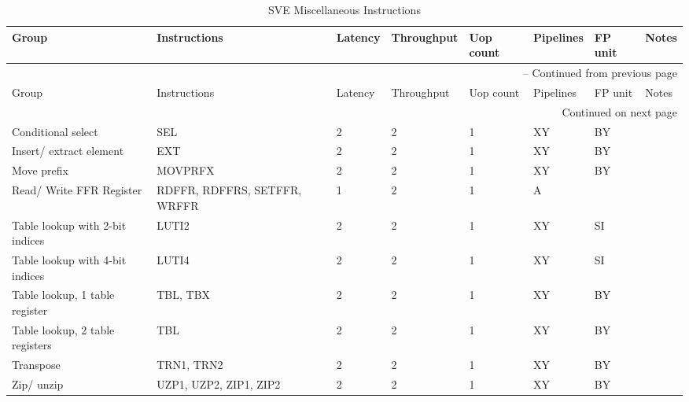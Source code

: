 \newpage
\begin{longtable}{|p{1in}|p{1in}|l|l|l|p{1in}|l|p{1in}|}
\caption{SVE Miscellaneous Instructions} \\
\hline
Group & Instructions & Latency & Throughput & Uop count & Pipelines & FP unit & Notes\\
\hline
\endfirsthead
\hline
\multicolumn{8}{|r|}{{\tablename\ \thetable{} -- Continued from previous page}} \\
\hline
Group & Instructions & Latency & Throughput & Uop count & Pipelines & FP unit & Notes\\
\hline
\endhead
\hline
\multicolumn{8}{|r|}{{Continued on next page}} \\
\hline
\endfoot
\hline
\endlastfoot
Conditional select & SEL & 2 & 2 & 1 & XY & BY & \\
\hline
Insert/ extract element & EXT & 2 & 2 & 1 & XY & BY & \\
\hline
Move prefix & MOVPRFX & 2 & 2 & 1 & XY & BY & \\
\hline
Read/ Write FFR Register & RDFFR, RDFFRS, SETFFR, WRFFR & 1 & 2 & 1 & A &  & \\
\hline
Table lookup with 2-bit indices & LUTI2 & 2 & 2 & 1 & XY & SI & \\
\hline
Table lookup with 4-bit indices & LUTI4 & 2 & 2 & 1 & XY & SI & \\
\hline
Table lookup, 1 table register & TBL, TBX & 2 & 2 & 1 & XY & BY & \\
\hline
Table lookup, 2 table registers & TBL & 2 & 2 & 1 & XY & BY & \\
\hline
Transpose & TRN1, TRN2 & 2 & 2 & 1 & XY & BY & \\
\hline
Zip/ unzip & UZP1, UZP2, ZIP1, ZIP2 & 2 & 2 & 1 & XY & BY & \\
\hline
\end{longtable}
\newpage
